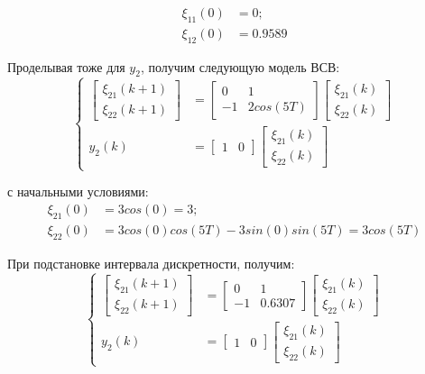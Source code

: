 \documentclass[a4paper,14pt]{extreport}
\begin{document}
\begin{align}
\xi_{11}(0) &= 0;\\
\xi_{12}(0) &= 0.9589
\end{align}

Проделывая тоже для $y_2$, получим следующую модель ВСВ:
\begin{equation}
\begin{cases}
\begin{bmatrix}
\xi_{21}(k+1) \\
\xi_{22}(k+1)
\end{bmatrix}
&=\begin{bmatrix}
0&1\\
-1 & 2 cos(5T)
\end{bmatrix}
\begin{bmatrix}
\xi_{21}(k)\\
\xi_{22}(k)
\end{bmatrix}
\\
y_2(k) &= \begin{bmatrix}
1& 0
\end{bmatrix}
\begin{bmatrix}
\xi_{21}(k)\\
\xi_{22}(k)
\end{bmatrix}
\end{cases}
\end{equation}

с начальными условиями:
\begin{align}
\xi_{21}(0) &= 3 cos(0) = 3;\\
\xi_{22}(0) &= 3 cos(0) cos(5T) - 3 sin(0) sin(5 T) = 3 cos(5T)
\end{align}

При подстановке интервала дискретности, получим:
\begin{equation}
\begin{cases}
\begin{bmatrix}
\xi_{21}(k+1) \\
\xi_{22}(k+1)
\end{bmatrix}
&=\begin{bmatrix}
0&1\\
-1  & 0.6307
\end{bmatrix}
\begin{bmatrix}
\xi_{21}(k)\\
\xi_{22}(k)
\end{bmatrix}
\\
y_2(k) &= \begin{bmatrix}
1& 0
\end{bmatrix}
\begin{bmatrix}
\xi_{21}(k)\\
\xi_{22}(k)
\end{bmatrix}
\end{cases}
\end{equation}
\end{document}
